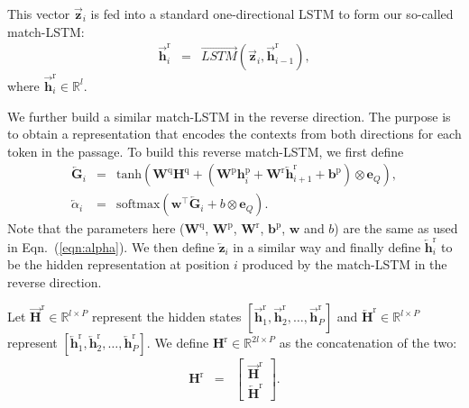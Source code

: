 \documentclass{article} \usepackage{iclr2017_conference,times}
\begin{document}
This vector $\overrightarrow{\mathbf{z}}_i$ is fed into a standard one-directional LSTM to form our so-called match-LSTM:
\begin{eqnarray}
\overrightarrow{\mathbf{h}}^\text{r}_i & = & \overrightarrow{\textit{LSTM}}(\overrightarrow{\mathbf{z}}_i, \overrightarrow{\mathbf{h}}^\text{r}_{i-1}),
\end{eqnarray}
where $\overrightarrow{\mathbf{h}}^\text{r}_i\in \mathbb{R}^l$.

We further build a similar match-LSTM in the reverse direction.
The purpose is to obtain a representation that encodes the contexts from both directions for each token in the passage.
To build this reverse match-LSTM, we first define
\begin{eqnarray}
\nonumber
\overleftarrow{\mathbf{G}}_i & = & \text{tanh}(\mathbf{W}^{\text{q}} \mathbf{H}^{\text{q}} + (\mathbf{W}^{\text{p}} \mathbf{h}^{\text{p}}_i + \mathbf{W}^{\text{r}} \overleftarrow{\mathbf{h}}^{\text{r}}_{i+1} + \mathbf{b}^{\text{p}}) \otimes \mathbf{e}_Q ), \\
\label{eqn:reverse_alpha}
\overleftarrow{\alpha}_i & = & \text{softmax}(\mathbf{w}^\intercal \overleftarrow{\mathbf{G}}_i + b \otimes \mathbf{e}_Q).
\end{eqnarray}
Note that the parameters here ($\mathbf{W}^{\text{q}}$, $\mathbf{W}^{\text{p}}$, $\mathbf{W}^{\text{r}}$, $\mathbf{b}^{\text{p}}$, $\mathbf{w}$ and $b$) are the same as used in Eqn.~(\ref{eqn:alpha}).
We then define $\overleftarrow{\mathbf{z}}_i$ in a similar way and finally define $\overleftarrow{\mathbf{h}}^\text{r}_i$ to be the hidden representation at position $i$ produced by the match-LSTM in the reverse direction.

Let $\overrightarrow{\mathbf{H}}^\text{r} \in \mathbb{R}^{l \times P}$ represent the hidden states $[\overrightarrow{\mathbf{h}}^\text{r}_{1}, \overrightarrow{\mathbf{h}}^\text{r}_{2}, \ldots, \overrightarrow{\mathbf{h}}^\text{r}_{P}]$ and $\overleftarrow{\mathbf{H}}^\text{r} \in \mathbb{R}^{l \times P}$ represent $[\overleftarrow{\mathbf{h}}^\text{r}_{1}, \overleftarrow{\mathbf{h}}^\text{r}_{2}, \ldots, \overleftarrow{\mathbf{h}}^\text{r}_{P}]$.
We define $\mathbf{H}^\text{r} \in \mathbb{R}^{2l \times P}$ as the concatenation of the two:
\begin{eqnarray}
\mathbf{H}^\text{r} & = & \begin{bmatrix}
\overrightarrow{\mathbf{H}}^\text{r} \\
\overleftarrow{\mathbf{H}}^\text{r}
\end{bmatrix}.
\end{eqnarray}
\end{document}
